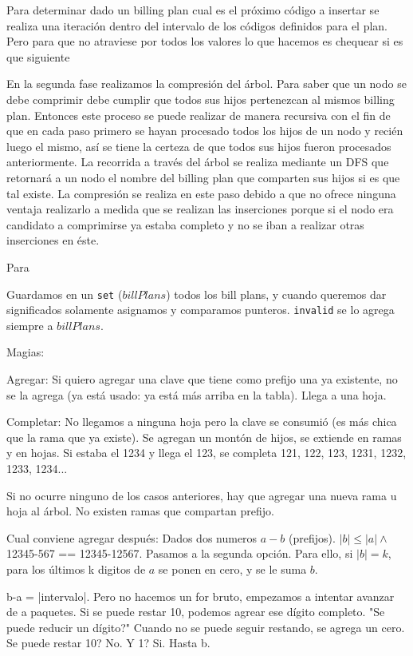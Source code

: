 Para determinar dado un billing plan cual es el próximo código a insertar 
se realiza una iteración dentro del intervalo de los códigos definidos para el plan.
Pero para que no atraviese por todos los valores lo que hacemos es chequear si es que siguiente


En la segunda fase realizamos la compresión del árbol. 
Para saber que un nodo se debe comprimir debe cumplir que todos sus hijos pertenezcan al mismos billing plan.
Entonces este proceso se puede realizar de manera recursiva con el fin de que en cada paso primero se hayan procesado
todos los hijos de un nodo y recién luego el mismo, así se tiene la certeza de que todos sus hijos fueron procesados
anteriormente. La recorrida a través del árbol se realiza mediante un DFS que retornará a un nodo el nombre del billing plan que 
comparten sus hijos si es que tal existe. La compresión se realiza en este paso debido a que no ofrece
ninguna ventaja realizarlo a medida que se realizan las inserciones porque si el nodo era candidato a comprimirse
ya estaba completo y no se iban a realizar otras inserciones en éste.

Para 

Guardamos en un {\tt set} ($billPlans$) todos los bill plans, y cuando queremos
dar significados solamente asignamos y comparamos punteros. {\tt invalid} se lo
agrega siempre a $billPlans$.

Magias:

Agregar: Si quiero agregar una clave que tiene como prefijo una ya existente,
no se la agrega (ya está usado: ya está más arriba en la tabla). Llega
a una hoja.

Completar: No llegamos a ninguna hoja pero la clave se consumió (es más
chica que la rama que ya existe). Se agregan un montón de hijos, se extiende
en ramas y en hojas. Si estaba el 1234 y llega el 123, se completa 121, 122,
123, 1231, 1232, 1233, 1234...

Si no ocurre ninguno de los casos anteriores, hay que agregar una nueva rama u
hoja al árbol. No existen ramas que compartan prefijo. 

Cual conviene agregar después: Dados dos numeros $a-b$ (prefijos). $|b| \le |a|
\land$ 12345-567 == 12345-12567. Pasamos a la segunda opción. Para ello, si
$|b|=k$, para los últimos k digitos de $a$ se ponen en cero, y se le suma $b$.

b-a = |intervalo|. Pero no hacemos un for bruto, empezamos a intentar avanzar de
a paquetes. Si se puede restar 10, podemos agrear ese dígito completo. "Se puede
reducir un dígito?" Cuando no se puede seguir restando, se agrega un cero. Se
puede restar 10? No. Y 1? Si. Hasta b.

